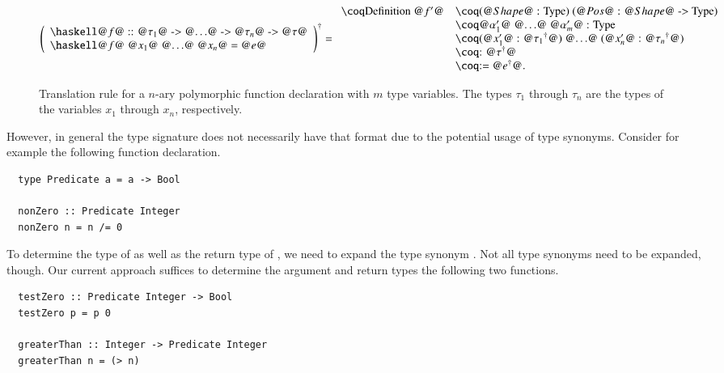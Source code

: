 \begin{figure}[H]
  \[
    \toCoq{\left(
      \begin{array}{l}
        \haskellM{@$f$@ :: @$\tau_1$@ -> @$\ldots$@ -> @$\tau_n$@ -> @$\tau$@} \\
        \haskellM{@$f$@ @$x_1$@ @$\ldots$@ @$x_n$@ = @$e$@}
      \end{array}
    \right)}
    = \begin{array}{ll}
        \coqM{Definition @$f'$@}
          &\coqM{(@$\Shape$@ : Type) (@$\Pos$@ : @$\Shape$@ -> Type)}     \\
          &\coqM{{@$\alpha_1'$@ @$\ldots$@ @$\alpha_m'$@ : Type}}         \\
          &\coqM{(@$x_1'$@ : @$\toCoqX{\tau_1}$@) @$\ldots$@ (@$x_n'$@ : @$\toCoqX{\tau_n}$@)}                                           \\
          &\coqM{: @$\toCoqX{\tau}$@}                                     \\
          &\coqM{:= @$\toCoqX{e}$@.}                                      \\
      \end{array}
  \]
  \caption{
    Translation rule for a $n$-ary polymorphic function declaration with $m$ type variables.
    The types $\tau_1$ through $\tau_n$ are the types of the variables $x_1$ through $x_n$, respectively.
  }
  \label{fig:translation:func-decl:non-rec}
\end{figure}

However, in general the type signature does not necessarily have that format due to the potential usage of type synonyms.
Consider for example the following function declaration.
\begin{verbatim}
  type Predicate a = a -> Bool

  nonZero :: Predicate Integer
  nonZero n = n /= 0
\end{verbatim}
To determine the type of  as well as the return type of , we need to expand the type synonym .
Not all type synonyms need to be expanded, though.
Our current approach suffices to determine the argument and return types the following two functions.
\begin{verbatim}
  testZero :: Predicate Integer -> Bool
  testZero p = p 0

  greaterThan :: Integer -> Predicate Integer
  greaterThan n = (> n)
\end{verbatim}

